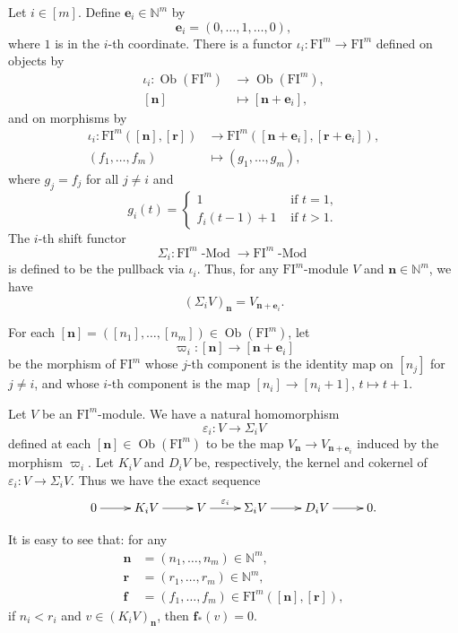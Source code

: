 \documentclass{amsart}
\numberwithin{equation}{section}
\DeclareMathOperator{\Mod}{-Mod}
\DeclareMathOperator{\Ob}{Ob}
\newcommand{\N}{{\mathbb{N}}}
\newcommand{\FI}{{\mathrm{FI}}}
\begin{document}
Let $i\in [m]$. Define $\mathbf{e}_i \in \N^m$ by 
\[ \mathbf{e}_i = (0, \ldots, 1, \ldots, 0), \]
where $1$ is in the $i$-th coordinate. There is a functor $\iota_i : \FI^m \to \FI^m$ defined on objects by 
\begin{align*} 
   \iota_i : \Ob(\FI^m) &\to \Ob(\FI^m), \\ 
   [\mathbf{n}] &\mapsto [\mathbf{n}+\mathbf{e}_i],
\end{align*}
and on morphisms by
\begin{align*}
    \iota_i : \FI^m([\mathbf{n}], [\mathbf{r}]) &\to \FI^m([\mathbf{n}+\mathbf{e}_i], [\mathbf{r}+\mathbf{e}_i]), \\
     (f_1, \ldots, f_m) &\mapsto (g_1, \ldots, g_m), 
\end{align*}
where
$g_j=f_j$ for all $j\neq i$ and
\[ g_i(t) = \left\{ \begin{array}{ll} 
1 & \mbox{ if } t=1, \\
f_i(t-1)+1 & \mbox{ if } t>1. \end{array} \right.\]
The $i$-th shift functor 
\[ \Sigma_i : \FI^m\Mod \to \FI^m\Mod \] 
is defined to be the pullback via $\iota_i$. Thus, for any $\FI^m$-module $V$ and $\mathbf{n}\in \N^m$, we have 
\[ (\Sigma_i V)_{\mathbf{n}} = V_{\mathbf{n}+\mathbf{e}_i}. \] 

For each $[\mathbf{n}]=([n_1], \ldots, [n_m])\in\Ob(\FI^m)$, let 
\[ \varpi_i : [\mathbf{n}] \to [\mathbf{n}+\mathbf{e}_i] \] 
be the morphism of $\FI^m$ whose $j$-th component is the identity map on $[n_j]$ for $j\neq i$, and whose $i$-th component is the map $[n_i] \to [n_i+1]$, $t \mapsto t+1$. 

Let $V$ be an $\FI^m$-module. We have a natural homomorphism 
\[ \varepsilon_i: V\to \Sigma_i V \] 
defined at each $[\mathbf{n}]\in\Ob(\FI^m)$ to be the map $V_{\mathbf{n}} \to V_{\mathbf{n} + \mathbf{e}_i}$ induced by the morphism $\varpi_i$. 
Let $K_i V$ and $D_i V$ be, respectively, the kernel and cokernel of $\varepsilon_i: V\to \Sigma_i V$. Thus we have the exact sequence
\[ \xymatrix{
    0 \ar[r] & K_i V \ar[r] & V \ar[r]^-{\varepsilon_i} & \Sigma_i V \ar[r] & D_i V \ar[r] & 0. } \]

It is easy to see that: for any 
\begin{align*}
   \mathbf{n}&=(n_1, \ldots, n_m)\in \N^m,\\ 
   \mathbf{r}&=(r_1, \ldots, r_m)\in \N^m,\\ 
   \mathbf{f}&=(f_1, \ldots, f_m)\in \FI^m([\mathbf{n}], [\mathbf{r}]),
\end{align*}
if $n_i < r_i$ and $v\in (K_iV)_{\mathbf{n}}$, then $\mathbf{f}_*(v)=0$. 
\end{document}
